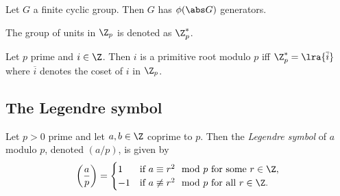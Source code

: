 \documentclass{article}
\begin{document}
\begin{corollary}
	Let $G$ a finite cyclic group. Then $G$ has $\phi(\abs G)$ generators.
\end{corollary}

\begin{definition}
	The group of units in $\Z_p$ is denoted as $\Z_p^*$.
\end{definition}

\begin{theorem}
	Let $p$ prime and $i\in\Z$. Then $i$ is a primitive root modulo $p$ iff
	$\Z_p^*=\lra{\overline i}$ where $\overline i$ denotes the coset of $i$ in
	$\Z_p$.
\end{theorem}

\subsection{The Legendre symbol}

\begin{definition}
	Let $p>0$ prime and let $a,b\in\Z$ coprime to $p$.
	Then the \emph{Legendre symbol} of $a$ modulo $p$, denoted $(a/p)$, is given by
	\begin{align*}
		\left(\frac{a}{p}\right)=\begin{cases}
			                         1  & \text{if }a\equiv r^2\mod p\text{ for some $r\in\Z$},    \\
			                         -1 & \text{if }a\not\equiv r^2\mod p\text{ for all $r\in\Z$}.
		                         \end{cases}
	\end{align*}
\end{definition}
\end{document}
